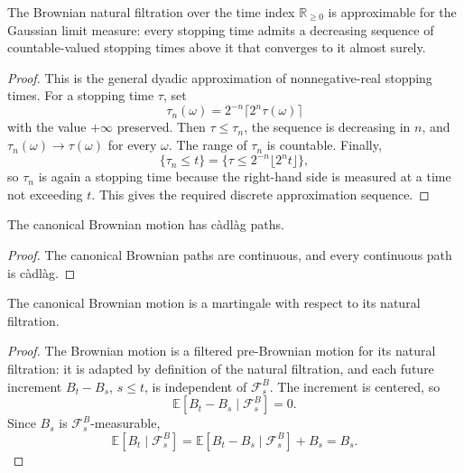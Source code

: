 \begin{lemma}\label{lem:brownianNaturalFiltration_approximable}
  \leanok
The Brownian natural filtration over the time index \(\mathbb R_{\ge 0}\) is
approximable for the Gaussian limit measure: every stopping time admits a
decreasing sequence of countable-valued stopping times above it that converges
to it almost surely.
\end{lemma}

\begin{proof}

\leanok
This is the general dyadic approximation of nonnegative-real stopping times.
For a stopping time \(\tau\), set
\[
  \tau_n(\omega)=2^{-n}\lceil 2^n\tau(\omega)\rceil
\]
with the value \(+\infty\) preserved.  Then \(\tau\le \tau_n\), the sequence is
decreasing in \(n\), and \(\tau_n(\omega)\to\tau(\omega)\) for every
\(\omega\).  The range of \(\tau_n\) is countable.  Finally,
\[
  \{\tau_n\le t\}
  =
  \{\tau\le 2^{-n}\lfloor 2^n t\rfloor\},
\]
so \(\tau_n\) is again a stopping time because the right-hand side is measured
at a time not exceeding \(t\).  This gives the required discrete approximation
sequence.
\end{proof}

\begin{lemma}\label{lem:isCadlag_brownian}
  \leanok
The canonical Brownian motion has càdlàg paths.
\end{lemma}

\begin{proof}


\leanok
The canonical Brownian paths are continuous, and every continuous path is càdlàg.
\end{proof}

\begin{lemma}\label{lem:martingale_brownian}
  \leanok
The canonical Brownian motion is a martingale with respect to its natural filtration.
\end{lemma}

\begin{proof}


\leanok
The Brownian motion is a filtered pre-Brownian motion for its natural filtration:
it is adapted by definition of the natural filtration, and each future increment
\(B_t-B_s\), \(s\le t\), is independent of \(\mathcal F^B_s\).  The increment is
centered, so
\[
  \mathbb E[B_t-B_s\mid \mathcal F^B_s]=0.
\]
Since \(B_s\) is \(\mathcal F^B_s\)-measurable,
\[
  \mathbb E[B_t\mid\mathcal F^B_s]
  =\mathbb E[B_t-B_s\mid\mathcal F^B_s]+B_s
  =B_s.
\]
\end{proof}

